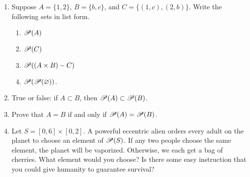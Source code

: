 \probsec{~\ref{sec:power-set}}
\begin{enumerate}
    \item Suppose $A = \{1, 2\}$, $B = \{b,c\}$, and $C = \{(1,c), (2,b)\}$. Write the following sets in list form.
  \begin{enumerate}
      \item $\mathscr{P}(A)$
      \item $\mathscr{P}(C)$
      \item $\mathscr{P}((A \times B) - C)$
      \item $\mathscr{P}(\mathscr{P}(\varnothing))$.
  \end{enumerate}

    \item True or false: if $A \subset B$, then $\mathscr{P}(A) \subset \mathscr{P}(B)$.

    \item Prove that $A = B$ if and only if $\mathscr{P}(A) = \mathscr{P}(B)$.

    \item Let $S = [0,6] \times [0,2]$. A powerful eccentric alien orders every adult on the planet to choose an element of $\mathscr{P}(S)$. If any two people choose the same element, the planet will be vaporized. Otherwise, we each get a bag of cherries. What element would you choose? Is there some easy instruction that you could give humanity to guarantee survival?
\end{enumerate}

